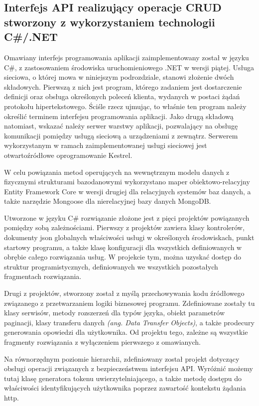 \subsection*{Interfejs API realizujący operacje CRUD stworzony z wykorzystaniem technologii C\#/.NET}
Omawiany interfejs programowania aplikacji zaimplementowany został w języku C\#, z zastosowaniem środowiska uruchomieniowego .NET w wersji piątej. Usługa sieciowa, o której mowa w niniejszym podrozdziale, stanowi złożenie dwóch składowych. Pierwszą z nich jest program, którego zadaniem jest dostarczenie definicji oraz obsługa określonych poleceń klienta, wydanych w postaci żądań protokołu hipertekstowego. Ściśle rzecz ujmując, to właśnie ten program należy określić terminem interfejsu programowania aplikacji. Jako drugą składową natomiast, wskazać należy serwer warstwy aplikacji, pozwalający na obsługę komunikacji pomiędzy usługą sieciową a urządzeniami z zewnątrz. Serwerem wykorzystanym w ramach zaimplementowanej usługi sieciowej jest otwartoźródłowe oprogramowanie Kestrel.

W celu powiązania metod operujących na wewnętrznym modelu danych z fizycznymi strukturami bazodanowymi wykorzystano maper obiektowo-relacyjny Entity Framework Core w wersji drugiej dla relacyjnych systemów baz danych, a także narzędzie Mongoose dla nierelacyjnej bazy danych MongoDB.

Utworzone w języku C\# rozwiązanie złożone jest z pięci projektów powiązanych pomiędzy sobą zależnościami. Pierwszy z projektów zawiera klasy kontrolerów, dokumenty json globalnych właściwości usługi w określonych środowiskach, punkt startowy programu, a także klasę konfiguracji dla wszystkich definiowanych w obrębie całego rozwiązania usług. W projekcie tym, można uzyskać dostęp do struktur programistycznych, definiowanych we wszystkich pozostałych fragmentach rozwiązania.

Drugi z projektów, stworzony został z myślą przechowywania kodu źródłowego związanego z przetwarzaniem logiki biznesowej programu. Zdefiniowane zostały tu klasy serwisów, metody rozszerzeń dla typów języka, obiekt parametrów paginacji, klasy transferu danych \textit{(ang. Data Transfer Objects)}, a także prodecury generowania opowiedzi dla użytkownika. Od projektu tego, zależne są wszystkie fragmenty rozwiązania z wyłączeniem pierwszego z omawianych.

Na równorzędnym poziomie hierarchii, zdefiniowany został projekt dotyczący obsługi operacji związanych z bezpieczeństwem interfejsu API. Wyróżnić możemy tutaj klasę generatora tokenu uwierzytelniającego, a także metodę dostępu do właściwości identyfikujących użytkownika poprzez zawartość kontekstu żądania http.

